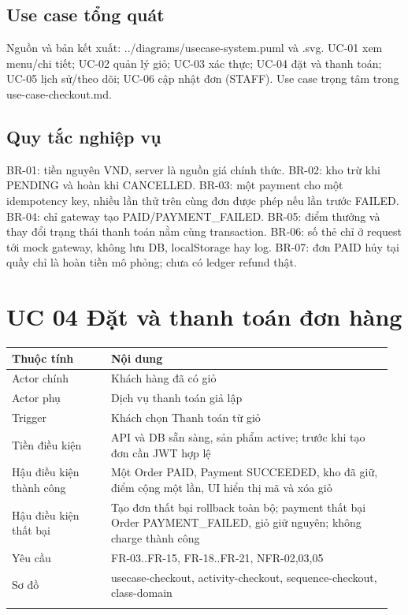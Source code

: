 \documentclass[a4paper,12pt,oneside]{report}
\begin{document}
\subsection{Use case tổng quát}
Nguồn và bản kết xuất: {\small\ttfamily .\allowbreak{}.\allowbreak{}/\allowbreak{}diagrams/\allowbreak{}usecase-\allowbreak{}system.\allowbreak{}puml} và {\small\ttfamily .\allowbreak{}svg}. UC-01 xem menu/\allowbreak{}chi tiết; UC-02 quản lý giỏ; UC-03 xác thực; UC-04 đặt và thanh toán; UC-05 lịch sử/\allowbreak{}theo dõi; UC-06 cập nhật đơn (STAFF). Use case trọng tâm trong {\small\ttfamily use-\allowbreak{}case-\allowbreak{}checkout.\allowbreak{}md}.


\subsection{Quy tắc nghiệp vụ}
BR-01: tiền nguyên VND, server là nguồn giá chính thức. BR-02: kho trừ khi PENDING và hoàn khi CANCELLED. BR-03: một payment cho một idempotency key, nhiều lần thử trên cùng đơn được phép nếu lần trước FAILED. BR-04: chỉ gateway tạo PAID/\allowbreak{}PAYMENT\_FAILED. BR-05: điểm thưởng và thay đổi trạng thái thanh toán nằm cùng transaction. BR-06: số thẻ chỉ ở request tới mock gateway, không lưu DB, localStorage hay log. BR-07: đơn PAID hủy tại quầy chỉ là hoàn tiền mô phỏng; chưa có ledger refund thật.


\section{UC 04 Đặt và thanh toán đơn hàng}

\begingroup\fontsize{9}{11}\selectfont\setlength{\tabcolsep}{3pt}\renewcommand{\arraystretch}{1.35}
\begin{longtable}{@{}>{\raggedright\arraybackslash}p{0.25\linewidth} >{\raggedright\arraybackslash}p{0.71\linewidth}@{}}
\toprule
\textbf{Thuộc tính} & \textbf{Nội dung} \\
\midrule\endhead
Actor chính & Khách hàng đã có giỏ \\
\addlinespace[2pt]
Actor phụ & Dịch vụ thanh toán giả lập \\
\addlinespace[2pt]
Trigger & Khách chọn Thanh toán từ giỏ \\
\addlinespace[2pt]
Tiền điều kiện & API và DB sẵn sàng, sản phẩm active; trước khi tạo đơn cần JWT hợp lệ \\
\addlinespace[2pt]
Hậu điều kiện thành công & Một Order PAID, Payment SUCCEEDED, kho đã giữ, điểm cộng một lần, UI hiển thị mã và xóa giỏ \\
\addlinespace[2pt]
Hậu điều kiện thất bại & Tạo đơn thất bại rollback toàn bộ; payment thất bại Order PAYMENT\_FAILED, giỏ giữ nguyên; không charge thành công \\
\addlinespace[2pt]
Yêu cầu & FR-03..FR-15, FR-18..FR-21, NFR-02,03,05 \\
\addlinespace[2pt]
Sơ đồ & usecase-checkout, activity-checkout, sequence-checkout, class-domain \\
\addlinespace[2pt]
\bottomrule\end{longtable}\endgroup
\end{document}
